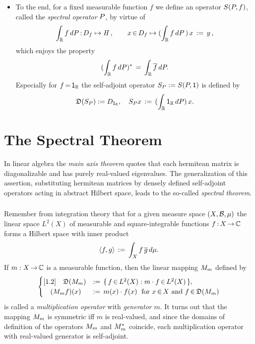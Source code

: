 \documentclass[11pt,twoside]{article}
\begin{document}
\begin{itemize}[leftmargin=12pt,itemsep=5pt]
\item[5.]
To the end,
for a fixed measurable function $f$
we define an operator $S({P},f)$,
called the \textit{spectral operator} {\wrt} ${P}$,
by virtue of
\begin{equation}\label{FUNCTIONAL_CALCULUS}
\int_{{\mathbb{R}}} f \, d{P} {\,:\,} D_f \mapsto \mathit{H}\,,
\quad \quad
x {\,\in\,} D_f \mapsto (\int_{{\mathbb{R}}} f \, d{P}\,) \, x \,:=\, y\,,
\end{equation}
which enjoys the property
\[
(\int_{{\mathbb{R}}} f \, d{P})^* \,=\, \int_{{\mathbb{R}}} \overline{f} \, d{P}.
\]
Especially for $f {\,=\,} {\mathsf{1}}_{{\mathbb{R}}}$ 
the self-adjoint operator ${S}_P := {S}({P},{\mathsf{1}})$ is defined by
\[
\mathfrak{D}({S}_P) := D_{{\mathsf{1}}_{{\mathbb{R}}}},
\quad {S}_P x \,:=\, (\int_{{\mathbb{R}}} {\mathsf{1}}_{{\mathbb{R}}} \, d{P}) \, x.
\]
\end{itemize}

\section{The Spectral Theorem}
In linear algebra
the \textit{main axis theorem} quotes
that each hermitean matrix is diagonalizable
and has purely real-valued eigenvalues.
The generalization of this assertion,
substituting hermitean matrices by densely defined self-adjoint operators
acting in abstract Hilbert space,
leads to the so-called \textit{spectral theorem}.

\subsubsection*{} %
Remember from integration theory
that for a given measure space $(X,{\mathcal{B}},\mu)$
the linear space $L^2(X)$ of measurable and square-integrable functions
$f{\,:\,}X {\,\to\,} {\mathbb{C}}$ forms a Hilbert space with inner product
\[
\langle f,g \rangle \,:=\, \int_X f \, \overline{g} \, d\mu.
\]
If $m:X {\,\to\,} {\mathbb{C}}$ is a measurable function,
then the linear mapping ${M}_m$ defined by
\[
\begin{cases}[1.2]
\quad \mathfrak{D}({M}_m) & := \,
\{\, f {\,\in\,} L^2(X): m \cdot f {\,\in\,} L^2(X)\,\}, \\
\quad ({M}_m f)(x) & := \, m(x) \cdot f(x) \;
\mbox{ for } x {\,\in\,} X \mbox{ and } f {\,\in\,} \mathfrak{D}({M}_m) \\
\end{cases}
\]
is called a \textit{multiplication operator} with \textit{generator} $m$.
It turns out that the mapping ${M}_m$ is symmetric
iff
$m$ is real-valued,
and since the domains of definition
of the operators ${M}_m$ and ${M}_m^*$ coincide,
each multiplication operator with real-valued generator is self-adjoint.
\end{document}
